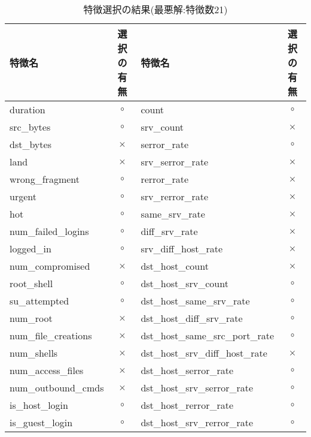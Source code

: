 \begin{table}[htbp]
  \setlength{\tabcolsep}{2pt} %
  \renewcommand{\arraystretch}{0.8} %
  \centering
  \caption{特徴選択の結果(最悪解:特徴数21)}
  \begin{tabular}{|l|c|l|c|}
      \hline
      特徴名 & 選択の有無 & 特徴名 & 選択の有無   \\
      \hline
      duration & \(\circ\) & count & \(\circ\)  \\
      \hline
      src\_bytes & \(\circ\) & srv\_count & \(\times\)   \\
      \hline
      dst\_bytes & \(\times\) & serror\_rate & \(\circ\)   \\
      \cline{1-4}
      land & \(\times\) & srv\_serror\_rate & \(\times\)   \\
      \cline{1-4}
      wrong\_fragment & \(\circ\) & rerror\_rate & \(\times\)   \\
      \cline{1-4}
      urgent & \(\circ\) & srv\_rerror\_rate & \(\times\)   \\
      \cline{1-4}
      hot & \(\circ\) & same\_srv\_rate & \(\times\)   \\
      \cline{1-4}
      num\_failed\_logins & \(\circ\) & diff\_srv\_rate &  \(\times\)  \\
      \cline{1-4}
      logged\_in & \(\circ\) & srv\_diff\_host\_rate &  \(\times\)   \\
      \cline{1-4}
      num\_compromised & \(\times\) & dst\_host\_count & \(\times\)   \\
      \cline{1-4}
      root\_shell & \(\circ\) & dst\_host\_srv\_count &\(\circ\)   \\
      \cline{1-4}
      su\_attempted & \(\circ\) & dst\_host\_same\_srv\_rate & \(\circ\)   \\
      \cline{1-4}
      num\_root & \(\times\) & dst\_host\_diff\_srv\_rate &  \(\circ\)  \\
      \cline{1-4}
      num\_file\_creations &  \(\times\) & dst\_host\_same\_src\_port\_rate &  \(\circ\)   \\
      \cline{1-4}
      num\_shells &  \(\times\) & dst\_host\_srv\_diff\_host\_rate & \(\times\)   \\
      \cline{1-4}
      num\_access\_files &  \(\times\) & dst\_host\_serror\_rate & \(\circ\)   \\
      \cline{1-4}
      num\_outbound\_cmds & \(\times\) & dst\_host\_srv\_serror\_rate & \(\circ\)   \\
      \cline{1-4}
      is\_host\_login & \(\circ\) &  dst\_host\_rerror\_rate & \(\circ\)   \\
      \cline{1-4}
      is\_guest\_login & \(\circ\) & dst\_host\_srv\_rerror\_rate & \(\circ\)  \\
      \cline{1-4}
  \end{tabular}
  \label{featurebad} 
\end{table}
